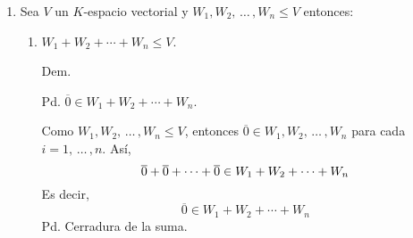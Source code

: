 \documentclass[fleqn]{article}                       %
\begin{document}
\begin{enumerate}
        \item Sea $ V $ un $ K $-espacio vectorial y $ W_1, W_2, \, \ldots \, , W_n \leq V $ entonces:
        \begin{enumerate}
            \item $	W_1 + W_2 + \cdots + W_n \leq V $. \par
            \hspace{2.7mm}  Dem. \par

            Pd. $ \overline{0} \in W_1 + W_2 + \cdots + W_n $. \par

            Como $ W_1, W_2,  \, \ldots \, , W_n \leq V $, entonces $ \overline{0} \in W_1, W_2, \, \ldots \, , W_n $ para cada $ i=1, \, \ldots \, ,n $. Así,
            \begin{equation*}
                \overline{0} + \overline{0} + \cdots + \overline{0} \in W_1 + W_2 + \cdots + W_n \\\\
            \end{equation*}
            Es decir,
            \begin{equation*}
                \overline{0} \in W_1 + W_2 + \cdots + W_n
            \end{equation*}
            Pd. Cerradura de la suma. \par


\end{enumerate}
\end{enumerate}
\end{document}
